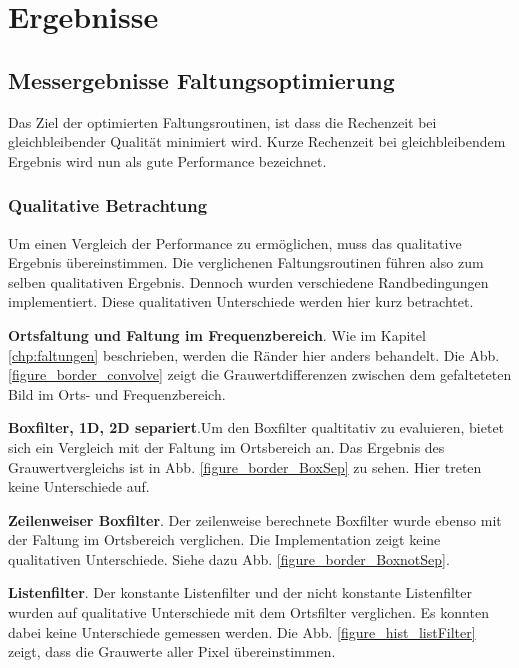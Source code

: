 \documentclass[a4paper,12pt]{article}
\begin{document}
\newpage
\section{Ergebnisse}
\subsection{Messergebnisse Faltungsoptimierung}\label{chp:mess_faltungen}

Das Ziel der optimierten Faltungsroutinen, ist dass die Rechenzeit bei
gleichbleibender Qualität minimiert wird. Kurze Rechenzeit bei
gleichbleibendem Ergebnis wird nun als gute Performance bezeichnet.

\subsubsection{Qualitative Betrachtung}
Um einen Vergleich der Performance zu ermöglichen, muss das qualitative Ergebnis
übereinstimmen. Die verglichenen Faltungsroutinen führen also zum selben
qualitativen Ergebnis. Dennoch wurden verschiedene Randbedingungen implementiert. 
Diese qualitativen Unterschiede werden hier kurz betrachtet.


\textbf{Ortsfaltung und Faltung im Frequenzbereich}. Wie im
Kapitel \ref{chp:faltungen} beschrieben, werden die Ränder hier anders
behandelt. Die Abb. \ref{figure_border_convolve} zeigt die Grauwertdifferenzen
zwischen dem gefalteteten Bild im Orts- und Frequenzbereich. 

\textbf{Boxfilter, 1D, 2D separiert}.Um den Boxfilter qualtitativ zu
evaluieren, bietet sich ein Vergleich mit der Faltung im Ortsbereich an.
Das Ergebnis des Grauwertvergleichs ist in Abb. \ref{figure_border_BoxSep} zu sehen. Hier treten
keine Unterschiede auf. 

\textbf{Zeilenweiser Boxfilter}. Der zeilenweise berechnete Boxfilter wurde
ebenso mit der Faltung im Ortsbereich verglichen. Die
Implementation zeigt keine qualitativen Unterschiede. Siehe dazu Abb. \ref{figure_border_BoxnotSep}.

\textbf{Listenfilter}. Der konstante Listenfilter und der nicht konstante
Listenfilter wurden auf qualitative Unterschiede mit dem Ortsfilter verglichen.
Es konnten dabei keine Unterschiede gemessen werden. Die Abb.
\ref{figure_hist_listFilter} zeigt, dass die Grauwerte aller Pixel
übereinstimmen.
\end{document}
